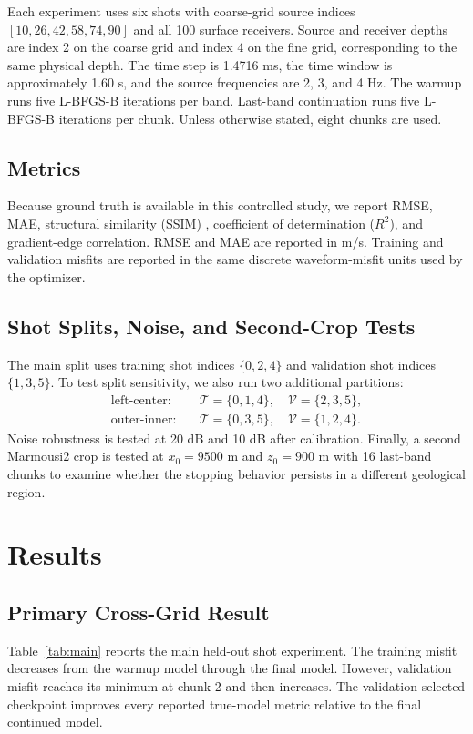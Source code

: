 \documentclass[10pt,twocolumn]{article}
\begin{document}
Each experiment uses six shots with coarse-grid source indices
$[10,26,42,58,74,90]$ and all 100 surface receivers. Source and receiver
depths are index 2 on the coarse grid and index 4 on the fine grid,
corresponding to the same physical depth. The time step is
1.4716 ms, the time window is approximately 1.60 s, and the source
frequencies are 2, 3, and 4 Hz. The warmup runs five L-BFGS-B iterations
per band. Last-band continuation runs five L-BFGS-B iterations per chunk.
Unless otherwise stated, eight chunks are used.

\subsection{Metrics}
Because ground truth is available in this controlled study, we report
RMSE, MAE, structural similarity (SSIM) \cite{wang2004ssim}, coefficient
of determination ($R^2$), and gradient-edge correlation. RMSE and MAE are
reported in m/s. Training and validation misfits are reported in the same
discrete waveform-misfit units used by the optimizer.

\subsection{Shot Splits, Noise, and Second-Crop Tests}
The main split uses training shot indices $\{0,2,4\}$ and validation shot
indices $\{1,3,5\}$. To test split sensitivity, we also run two additional
partitions:
\begin{equation*}
\begin{split}
  \text{left-center}:&\quad \mathcal{T}=\{0,1,4\},\quad
       \mathcal{V}=\{2,3,5\},\\
  \text{outer-inner}:&\quad \mathcal{T}=\{0,3,5\},\quad
       \mathcal{V}=\{1,2,4\}.
\end{split}
\end{equation*}
Noise robustness is tested at 20 dB and 10 dB after calibration. Finally,
a second Marmousi2 crop is tested at $x_0=9500$ m and $z_0=900$ m with
16 last-band chunks to examine whether the stopping behavior persists in
a different geological region.

\section{Results}
\subsection{Primary Cross-Grid Result}
Table~\ref{tab:main} reports the main held-out shot experiment. The
training misfit decreases from the warmup model through the final model.
However, validation misfit reaches its minimum at chunk 2 and then
increases. The validation-selected checkpoint improves every reported
true-model metric relative to the final continued model.
\end{document}

